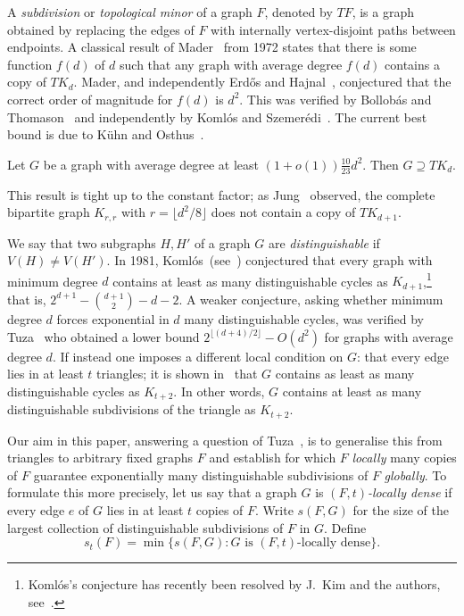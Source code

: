 \documentclass[12pt]{amsart}
\begin{document}
A \emph{subdivision} or \emph{topological minor} of a graph $F$, denoted by $TF$, is a graph obtained by replacing the edges of $F$ with internally vertex-disjoint paths between endpoints.
A classical result of Mader~\cite{mader} from 1972 states that there is some function $f(d)$ of $d$ such that any graph with average degree $f(d)$ contains a copy of $TK_d$. Mader, and independently Erd\H{o}s and Hajnal~\cite{eh}, conjectured that the correct order of magnitude for $f(d)$ is $d^2$.
This was verified by Bollob\'as and Thomason~\cite{bt} and independently by Koml\'os and Szemer\'edi~\cite{ks}.
The current best bound is due to K\"uhn and Osthus~\cite{KO-sub}.


\begin{theorem}\label{btks}
Let $G$ be a graph with average degree at least $(1+o(1))\frac{10}{23} d^2$. Then $G \supseteq TK_d$.
\end{theorem}

This result is tight up to the constant factor; as Jung~\cite{jung} observed, the complete bipartite graph $K_{r,r}$ with $r = \lfloor d^2/8 \rfloor$ does not contain a copy of $TK_{d+1}$. 

We say that two subgraphs $H,H'$ of a graph $G$ are \emph{distinguishable} if $V(H) \neq V(H')$. 
In 1981, Koml\'os~(see~\cite{tuza2}) conjectured that every graph with minimum degree $d$ contains at least as many distinguishable cycles as $K_{d+1}$,\footnote{Koml\'os's conjecture has recently been resolved by J.~Kim and the authors, see~\cite{KLShS}.} that is, $2^{d+1}-{d+1\choose 2}-d-2$. A weaker conjecture, asking whether minimum degree $d$ forces exponential in $d$ many distinguishable cycles, was verified by Tuza~\cite{tuza2} who obtained a lower bound $2^{\lfloor(d+4)/2\rfloor}-O(d^2)$ for graphs with average degree $d$. If instead one imposes a different local condition on $G$: that every edge lies in at least $t$ triangles; it is shown in~\cite{tuza2} that $G$ contains as least as many distinguishable cycles as $K_{t+2}$. 
In other words, $G$ contains at least as many distinguishable subdivisions of the triangle as $K_{t+2}$.

Our aim in this paper, answering a question of Tuza~\cite{tuza2,tuza,tuza3}, is to generalise this from triangles to arbitrary fixed graphs $F$ and establish for which $F$ \emph{locally} many copies of $F$ guarantee exponentially many distinguishable subdivisions of $F$ \emph{globally}.
To formulate this more precisely, let us say that a graph $G$ is \emph{$(F,t)$-locally dense} if every edge $e$ of $G$ lies in at least $t$ copies of $F$.
Write $s(F,G)$ for the size of the largest collection of distinguishable subdivisions of $F$ in $G$.
Define 
$$s_t(F)=\min\{ s(F,G) : G  \mbox{ is } (F,t)\mbox{-locally dense}\}.$$
\end{document}
